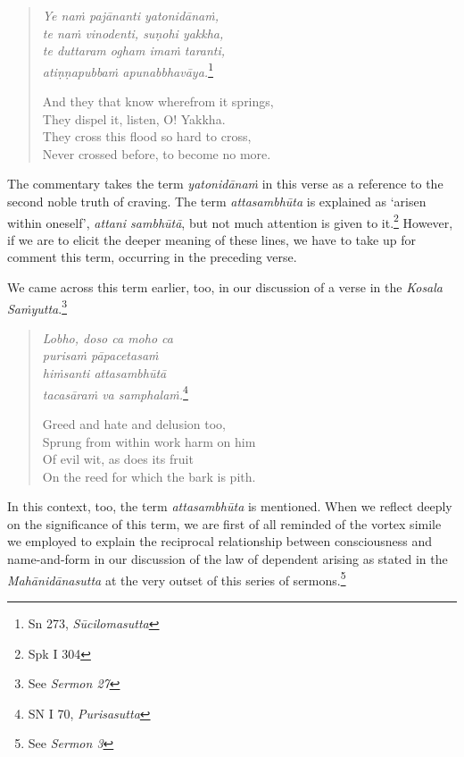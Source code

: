 \begin{quote}
\emph{Ye naṁ pajānanti yatonidānaṁ,}\\
\emph{te naṁ vinodenti, suṇohi yakkha,}\\
\emph{te duttaram ogham imaṁ taranti,}\\
\emph{atiṇṇapubbaṁ apunabbhavāya.}\footnote{Sn 273, \emph{Sūcilomasutta}}

And they that know wherefrom it springs,\\
They dispel it, listen, O! Yakkha.\\
They cross this flood so hard to cross,\\
Never crossed before, to become no more.
\end{quote}

The commentary takes the term \emph{yatonidānaṁ} in this verse as a reference to the second noble truth of craving. The term \emph{attasambhūta} is explained as `arisen within oneself', \emph{attani sambhūtā}, but not much attention is given to it.\footnote{Spk I 304} However, if we are to elicit the deeper meaning of these lines, we have to take up for comment this term, occurring in the preceding verse.

We came across this term earlier, too, in our discussion of a verse in the \emph{Kosala Saṁyutta}.\footnote{See \emph{Sermon 27}}

\begin{quote}
\emph{Lobho, doso ca moho ca}\\
\emph{purisaṁ pāpacetasaṁ}\\
\emph{hiṁsanti attasambhūtā}\\
\emph{tacasāraṁ va samphalaṁ.}\footnote{SN I 70, \emph{Purisasutta}}

Greed and hate and delusion too,\\
Sprung from within work harm on him\\
Of evil wit, as does its fruit\\
On the reed for which the bark is pith.
\end{quote}

In this context, too, the term \emph{attasambhūta} is mentioned. When we reflect deeply on the significance of this term, we are first of all reminded of the vortex simile we employed to explain the reciprocal relationship between consciousness and name-and-form in our discussion of the law of dependent arising as stated in the \emph{Mahānidānasutta} at the very outset of this series of sermons.\footnote{See \emph{Sermon 3}}

